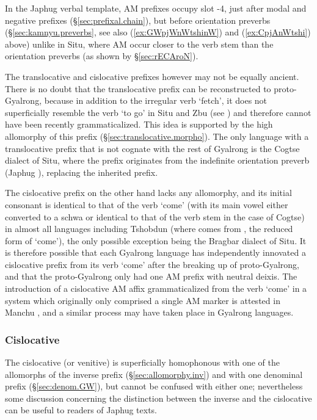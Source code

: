 In the Japhug verbal template, AM prefixes occupy slot -4, just after modal and negative prefixes (§\ref{sec:prefixal.chain}), but before orientation preverbs (§\ref{sec:kamnyu.preverbs}, see also (\ref{ex:GWpjWnWtshinW}) and (\ref{ex:CpjAnWtshi}) above) unlike in Situ, where AM occur closer to the verb stem than the orientation preverbs (as shown by §\ref{sec:rECAroN}).

The translocative and cislocative prefixes however may not be equally ancient. There is no doubt that the translocative prefix can be reconstructed to proto-Gyalrong, because in addition to the irregular verb `fetch', it does not superficially resemble the verb `to go' in Situ and Zbu (see ) and therefore cannot have been recently grammaticalized. This idea is supported by the high allomorphy of this prefix (§\ref{sec:translocative.morpho}). The only language with a translocative prefix that is not cognate with the rest of Gyalrong is the Cogtse dialect of Situ, where the prefix  originates from the indefinite orientation preverb (Japhug ), replacing the inherited prefix.

The cislocative prefix on the other hand lacks any allomorphy, and its initial consonant is identical to that of the verb `come' (with its main vowel either converted to a schwa or identical to that of the verb stem in the case of Cogtse) in almost all languages including Tshobdun (where  comes from , the reduced form of  `come'), the only possible exception being the Bragbar dialect of Situ. It is therefore possible that each Gyalrong language has independently innovated a cislocative prefix from its verb `come' after the breaking up of proto-Gyalrong, and that the proto-Gyalrong only had one AM prefix with neutral deixis. The introduction of a cislocative AM affix grammaticalized from the verb `come' in a system which originally only comprised a single AM marker is attested in Manchu \citep{fuente18am}, and a similar process may have taken place in Gyalrong languages.

\subsubsection{Cislocative} \label{sec:cislocative.morpho}
The cislocative (or venitive)  is superficially homophonous with one of the allomorphs of the inverse prefix  (§\ref{sec:allomorphy.inv}) and with one denominal prefix (§\ref{sec:denom.GW}), but cannot be confused with either one; nevertheless some discussion concerning the distinction between the inverse and the cislocative can be useful to readers of Japhug texts.


